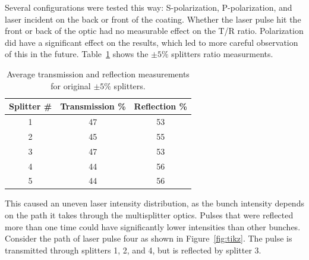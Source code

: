Several configurations were tested this way: S-polarization, P-polarization, 
and laser incident on the back or front of the coating. 
Whether the laser pulse hit the front or back of the optic
had no measurable effect on the T/R ratio. Polarization did have a significant effect on
the results, which led to more careful observation of this in the future.  
Table~\ref{tab:reflection} shows the $\pm 5\%$ splitters ratio measurments. 
\begin{table}%
	\begin{center}
		\caption{Average transmission and reflection measurements for original $\pm 5\%$ splitters.}
		\label{tab:reflection}
		\begin{tabular}{ccc}
			\toprule
			\toprule
			\textbf{Splitter \#} & \textbf{Transmission \%}  & \textbf{Reflection \%} \\ \hline
			1 &  47  &  53   \\ %
			2 &  45  &  55   \\ %
			3 &  47  &  53   \\		 
			4 &  44  & 	56	\\
			5 &  44  &  56   \\ \hline
		\end{tabular}	
	\end{center}
\end{table}
This caused an uneven laser intensity distribution, as the bunch intensity depends on the path 
it takes through the multisplitter optics. Pulses that were reflected more than one
time could have significantly lower intensities than other bunches.   
Consider the path of laser pulse four as shown in Figure~\ref{fig:tikz}. 
The pulse is transmitted through splitters 1, 2, and 4, but is reflected by splitter 3.
\def \delayvertical {1.5}
\def \delayoneleft {7.5}
\def \delaytworight{15}
\def \mycenter{10.0}
\def \labels{6.5}
\def \sone {-0.5}
\def \stwo {\sone+1.5}
\def \sthree {\stwo+1.5}
\def \sfour {\sthree+1.5}
\def \buffer{-4.5}
